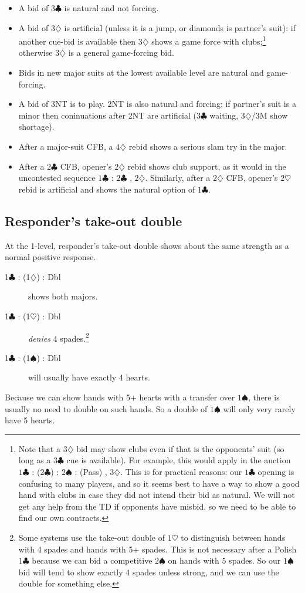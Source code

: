 \documentclass{article}
\newcommand{\sz}{\spadesuit}
\newcommand{\hz}{\heartsuit}
\newcommand{\dz}{\diamondsuit}
\newcommand{\cz}{\clubsuit}
\begin{document}
\begin{itemize}
\item A bid of $3\cz$ is natural and not forcing.
\item A bid of $3\dz$ is artificial (unless it is a jump, or diamonds is partner's suit): if another cue-bid is available then $3\dz$ shows a game force with clubs;\footnote{Note that a $3\dz$ bid may show clubs even if that is the opponents' suit (so long as a $3\cz$ cue is available). For example, this would apply in the auction $1\cz$ : ($2\cz$) : $2\sz$ : (Pass) , $3\dz$. This is for practical reasons: our $1\cz$ opening is confusing to many players, and so it seems best to have a way to show a good hand with clubs in case they did not intend their bid as natural. We will not get any help from the TD if opponents have misbid, so we need to be able to find our own contracts.} otherwise $3\dz$ is a general game-forcing bid.
\item Bids in new major suits at the lowest available level are natural and game-forcing.
\item A bid of 3NT is to play. 2NT is also natural and forcing; if partner's suit is a minor then coninuations after 2NT are artificial ($3\cz$ waiting, $3\dz$/3M show shortage).
\item After a major-suit CFB, a $4\dz$ rebid shows a serious slam try in the major.
\item After a $2\cz$ CFB, opener's $2\dz$ rebid shows club support, as it would in the uncontested sequence $1\cz$ : $2\cz$ , $2\dz$. Similarly, after a $2\dz$ CFB, opener's $2\hz$  rebid is artificial and shows the natural option of $1\cz$.
\end{itemize}

\subsection{Responder's take-out double}

At the 1-level, responder's take-out double shows about the same strength as a normal positive response.

\begin{description}
\item[1$\cz$ : (1$\dz$) : Dbl] shows both majors.
\item[1$\cz$ : (1$\hz$) : Dbl] \emph{denies} 4 spades.\footnote{Some systems use the take-out double of $1\hz$ to distinguish between hands with 4 spades and hands with 5+ spades. This is not necessary after a Polish $1\cz$ because we can bid a competitive $2\sz$ on hands with 5 spades. So our $1\sz$ bid will tend to show exactly 4 spades unless strong, and we can use the double for something else.}
\item[1$\cz$ : (1$\sz$) : Dbl] will usually have exactly 4 hearts.
\end{description}
Because we can show hands with 5+ hearts with a transfer over $1\sz$, there is usually no need to double on such hands. So a double of $1\sz$ will only very rarely have 5 hearts.
\end{document}
